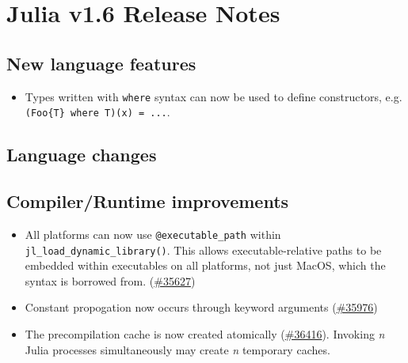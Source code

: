 

\part{Julia v1.6 Release Notes}



\hypertarget{190991524886526400}{}


\chapter{New language features}



\begin{itemize}
\item Types written with \texttt{where} syntax can now be used to define constructors, e.g. \texttt{(Foo\{T\} where T)(x) = ...}.

\end{itemize}


\hypertarget{3442424987907572838}{}


\chapter{Language changes}



\hypertarget{15772063917944537781}{}


\chapter{Compiler/Runtime improvements}



\begin{itemize}
\item All platforms can now use \texttt{@executable\_path} within \texttt{jl\_load\_dynamic\_library()}. This allows executable-relative paths to be embedded within executables on all platforms, not just MacOS, which the syntax is borrowed from. (\href{https://github.com/JuliaLang/julia/issues/35627}{\#35627})


\item Constant propogation now occurs through keyword arguments (\href{https://github.com/JuliaLang/julia/issues/35976}{\#35976})


\item The precompilation cache is now created atomically (\href{https://github.com/JuliaLang/julia/issues/36416}{\#36416}). Invoking \emph{n} Julia processes simultaneously may create \emph{n} temporary caches.

\end{itemize}


